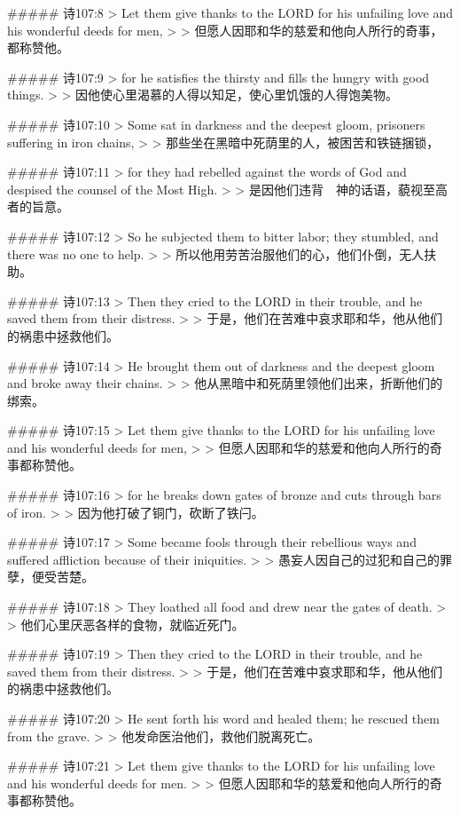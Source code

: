 ##### 诗107:8
> Let them give thanks to the LORD for his unfailing love and his wonderful deeds for men,
>
> 但愿人因耶和华的慈爱和他向人所行的奇事，都称赞他。


##### 诗107:9
> for he satisfies the thirsty and fills the hungry with good things.
>
> 因他使心里渴慕的人得以知足，使心里饥饿的人得饱美物。


##### 诗107:10
> Some sat in darkness and the deepest gloom, prisoners suffering in iron chains,
>
> 那些坐在黑暗中死荫里的人，被困苦和铁链捆锁，


##### 诗107:11
> for they had rebelled against the words of God and despised the counsel of the Most High.
>
> 是因他们违背　神的话语，藐视至高者的旨意。


##### 诗107:12
> So he subjected them to bitter labor; they stumbled, and there was no one to help.
>
> 所以他用劳苦治服他们的心，他们仆倒，无人扶助。


##### 诗107:13
> Then they cried to the LORD in their trouble, and he saved them from their distress.
>
> 于是，他们在苦难中哀求耶和华，他从他们的祸患中拯救他们。


##### 诗107:14
> He brought them out of darkness and the deepest gloom and broke away their chains.
>
> 他从黑暗中和死荫里领他们出来，折断他们的绑索。


##### 诗107:15
> Let them give thanks to the LORD for his unfailing love and his wonderful deeds for men,
>
> 但愿人因耶和华的慈爱和他向人所行的奇事都称赞他。


##### 诗107:16
> for he breaks down gates of bronze and cuts through bars of iron.
>
> 因为他打破了铜门，砍断了铁闩。


##### 诗107:17
> Some became fools through their rebellious ways and suffered affliction because of their iniquities.
>
> 愚妄人因自己的过犯和自己的罪孽，便受苦楚。


##### 诗107:18
> They loathed all food and drew near the gates of death.
>
> 他们心里厌恶各样的食物，就临近死门。


##### 诗107:19
> Then they cried to the LORD in their trouble, and he saved them from their distress.
>
> 于是，他们在苦难中哀求耶和华，他从他们的祸患中拯救他们。


##### 诗107:20
> He sent forth his word and healed them; he rescued them from the grave.
>
> 他发命医治他们，救他们脱离死亡。


##### 诗107:21
> Let them give thanks to the LORD for his unfailing love and his wonderful deeds for men.
>
> 但愿人因耶和华的慈爱和他向人所行的奇事都称赞他。


